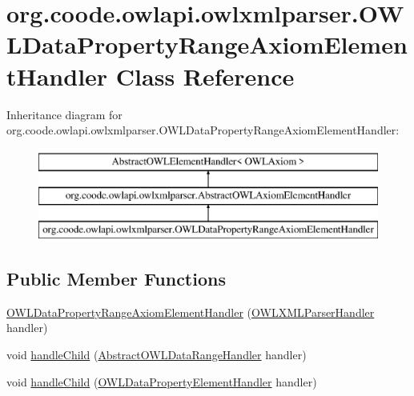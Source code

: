\hypertarget{classorg_1_1coode_1_1owlapi_1_1owlxmlparser_1_1_o_w_l_data_property_range_axiom_element_handler}{\section{org.\-coode.\-owlapi.\-owlxmlparser.\-O\-W\-L\-Data\-Property\-Range\-Axiom\-Element\-Handler Class Reference}
\label{classorg_1_1coode_1_1owlapi_1_1owlxmlparser_1_1_o_w_l_data_property_range_axiom_element_handler}
}
Inheritance diagram for org.\-coode.\-owlapi.\-owlxmlparser.\-O\-W\-L\-Data\-Property\-Range\-Axiom\-Element\-Handler\-:\begin{figure}[H]
\begin{center}
\leavevmode
\includegraphics[height=3.000000cm]{classorg_1_1coode_1_1owlapi_1_1owlxmlparser_1_1_o_w_l_data_property_range_axiom_element_handler}
\end{center}
\end{figure}
\subsection*{Public Member Functions}
\begin{DoxyCompactItemize}
\item 
\hyperlink{classorg_1_1coode_1_1owlapi_1_1owlxmlparser_1_1_o_w_l_data_property_range_axiom_element_handler_ae0d85393608a8a1e5e97c22a0e9b62a3}{O\-W\-L\-Data\-Property\-Range\-Axiom\-Element\-Handler} (\hyperlink{classorg_1_1coode_1_1owlapi_1_1owlxmlparser_1_1_o_w_l_x_m_l_parser_handler}{O\-W\-L\-X\-M\-L\-Parser\-Handler} handler)
\item 
void \hyperlink{classorg_1_1coode_1_1owlapi_1_1owlxmlparser_1_1_o_w_l_data_property_range_axiom_element_handler_aa67dd4b068472b5684be5fa18cfc67a7}{handle\-Child} (\hyperlink{classorg_1_1coode_1_1owlapi_1_1owlxmlparser_1_1_abstract_o_w_l_data_range_handler}{Abstract\-O\-W\-L\-Data\-Range\-Handler} handler)
\item 
void \hyperlink{classorg_1_1coode_1_1owlapi_1_1owlxmlparser_1_1_o_w_l_data_property_range_axiom_element_handler_af004f5e8efd6ff4bd0abef43be67dd5d}{handle\-Child} (\hyperlink{classorg_1_1coode_1_1owlapi_1_1owlxmlparser_1_1_o_w_l_data_property_element_handler}{O\-W\-L\-Data\-Property\-Element\-Handler} handler)
\end{DoxyCompactItemize}
